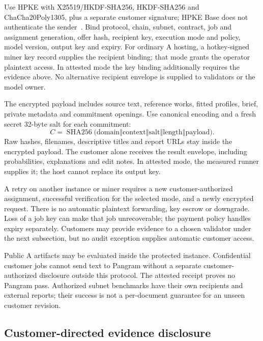 Use HPKE with X25519/HKDF-SHA256, HKDF-SHA256 and ChaCha20Poly1305,
plus a separate customer signature; HPKE Base does not authenticate the
sender~\cite{hpke}. Bind protocol, chain, subnet, contract, job and
assignment generation, offer hash, recipient key, execution mode and
policy, model version, output key and expiry. For ordinary A hosting,
a hotkey-signed miner key record supplies the recipient binding; that
mode grants the operator plaintext access. In attested mode the key
binding additionally requires the evidence above. No alternative
recipient envelope is supplied to validators or the model owner.

The encrypted payload includes source text, reference works, fitted
profiles, brief, private metadata and commitment openings. Use canonical
encoding and a fresh secret 32-byte salt for each commitment:
\begin{equation}\label{eq:input-commitment}
 C=\operatorname{SHA256}\bigl(
 \mathrm{domain}\mathbin\Vert\mathrm{context}\mathbin\Vert
 \mathrm{salt}\mathbin\Vert\mathrm{length}\mathbin\Vert
 \mathrm{payload}\bigr).
\end{equation}
Raw hashes, filenames, descriptive titles and report URLs stay inside
the encrypted payload. The customer alone receives the result envelope,
including probabilities, explanations and edit notes. In attested mode,
the measured runner supplies it; the host cannot replace its output key.

A retry on another instance or miner requires a new customer-authorized
assignment, successful verification for the selected mode, and a newly
encrypted request. There is no automatic plaintext forwarding, key
escrow or downgrade. Loss of a job key can make that job unrecoverable;
the payment policy handles expiry separately. Customers may provide
evidence to a chosen validator under the next subsection, but no audit
exception supplies automatic customer access.

Public A artifacts may be evaluated inside the protected instance.
Confidential customer jobs cannot send text to Pangram without a
separate customer-authorized disclosure outside this protocol. The
attested receipt proves no Pangram pass. Authorized subnet benchmarks
have their own recipients and external reports; their success is not a
per-document guarantee for an unseen customer revision.

\subsection{Customer-directed evidence
disclosure}\label{customer-directed-evidence-disclosure}


